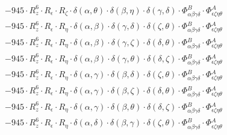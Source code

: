 \documentclass{article}
\begin{document}
\begin{equation}
\begin{array}{c}
 \\[0.2em] 		 - 945 \cdot R_{z}^{6} \cdot R_{\epsilon{}} \cdot R_{\zeta{}} \cdot \delta{}\left(\alpha{}, \theta{}\right) \cdot \delta{}\left(\beta{}, \eta{}\right) \cdot \delta{}\left(\gamma{}, \delta{}\right) \cdot \Phi{}^{B}_{\alpha{}\beta{}\gamma{}\delta{}} \cdot \Phi{}^{A}_{\epsilon{}\zeta{}\eta{}\theta{}} 
 \\[0.2em] 		 - 945 \cdot R_{z}^{6} \cdot R_{\epsilon{}} \cdot R_{\eta{}} \cdot \delta{}\left(\alpha{}, \beta{}\right) \cdot \delta{}\left(\gamma{}, \delta{}\right) \cdot \delta{}\left(\zeta{}, \theta{}\right) \cdot \Phi{}^{B}_{\alpha{}\beta{}\gamma{}\delta{}} \cdot \Phi{}^{A}_{\epsilon{}\zeta{}\eta{}\theta{}} 
 \\[0.2em] 		 - 945 \cdot R_{z}^{6} \cdot R_{\epsilon{}} \cdot R_{\eta{}} \cdot \delta{}\left(\alpha{}, \beta{}\right) \cdot \delta{}\left(\gamma{}, \zeta{}\right) \cdot \delta{}\left(\delta{}, \theta{}\right) \cdot \Phi{}^{B}_{\alpha{}\beta{}\gamma{}\delta{}} \cdot \Phi{}^{A}_{\epsilon{}\zeta{}\eta{}\theta{}} 
 \\[0.2em] 		 - 945 \cdot R_{z}^{6} \cdot R_{\epsilon{}} \cdot R_{\eta{}} \cdot \delta{}\left(\alpha{}, \beta{}\right) \cdot \delta{}\left(\gamma{}, \theta{}\right) \cdot \delta{}\left(\delta{}, \zeta{}\right) \cdot \Phi{}^{B}_{\alpha{}\beta{}\gamma{}\delta{}} \cdot \Phi{}^{A}_{\epsilon{}\zeta{}\eta{}\theta{}} 
 \\[0.2em] 		 - 945 \cdot R_{z}^{6} \cdot R_{\epsilon{}} \cdot R_{\eta{}} \cdot \delta{}\left(\alpha{}, \gamma{}\right) \cdot \delta{}\left(\beta{}, \delta{}\right) \cdot \delta{}\left(\zeta{}, \theta{}\right) \cdot \Phi{}^{B}_{\alpha{}\beta{}\gamma{}\delta{}} \cdot \Phi{}^{A}_{\epsilon{}\zeta{}\eta{}\theta{}} 
 \\[0.2em] 		 - 945 \cdot R_{z}^{6} \cdot R_{\epsilon{}} \cdot R_{\eta{}} \cdot \delta{}\left(\alpha{}, \gamma{}\right) \cdot \delta{}\left(\beta{}, \zeta{}\right) \cdot \delta{}\left(\delta{}, \theta{}\right) \cdot \Phi{}^{B}_{\alpha{}\beta{}\gamma{}\delta{}} \cdot \Phi{}^{A}_{\epsilon{}\zeta{}\eta{}\theta{}} 
 \\[0.2em] 		 - 945 \cdot R_{z}^{6} \cdot R_{\epsilon{}} \cdot R_{\eta{}} \cdot \delta{}\left(\alpha{}, \gamma{}\right) \cdot \delta{}\left(\beta{}, \theta{}\right) \cdot \delta{}\left(\delta{}, \zeta{}\right) \cdot \Phi{}^{B}_{\alpha{}\beta{}\gamma{}\delta{}} \cdot \Phi{}^{A}_{\epsilon{}\zeta{}\eta{}\theta{}} 
 \\[0.2em] 		 - 945 \cdot R_{z}^{6} \cdot R_{\epsilon{}} \cdot R_{\eta{}} \cdot \delta{}\left(\alpha{}, \delta{}\right) \cdot \delta{}\left(\beta{}, \gamma{}\right) \cdot \delta{}\left(\zeta{}, \theta{}\right) \cdot \Phi{}^{B}_{\alpha{}\beta{}\gamma{}\delta{}} \cdot \Phi{}^{A}_{\epsilon{}\zeta{}\eta{}\theta{}} 

\end{array}
\end{equation}
\end{document}
